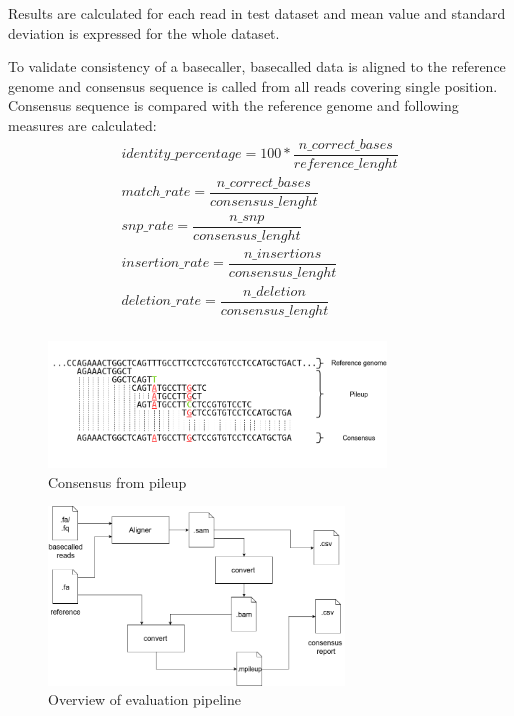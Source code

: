 \documentclass[times, utf8, diplomski, numeric, english]{fer}
\begin{document}
Results are calculated for each read in test dataset and mean value and standard deviation is expressed for the whole dataset.

To validate consistency of a basecaller, basecalled data is aligned to the reference genome and consensus sequence is called from all reads covering single position. Consensus sequence is compared with the reference genome and following measures are calculated:
\begin{gather*}
identity\_percentage =  100 * \dfrac{n\_correct\_bases}{reference\_lenght} \\
match\_rate = \dfrac{n\_correct\_bases}{consensus\_lenght} \\
snp\_rate = \dfrac{n\_snp}{consensus\_lenght}\\
insertion\_rate = \dfrac{n\_insertions}{consensus\_lenght}\\
deletion\_rate = \dfrac{n\_deletion}{consensus\_lenght}\\
\end{gather*}

\begin{figure}[!ht]
	\begin{center}
		\includegraphics[width=0.8\textwidth]{./imgs/consnesus.png}
		\caption{Consensus from pileup}
		\label{fg:consensus}
	\end{center}
\end{figure}


\begin{figure}[!ht]
	\begin{center}
		\includegraphics[width=0.7\textwidth]{./imgs/evaluation_pipeline.png}
		\caption{Overview of evaluation pipeline}
		\label{fg:eval_pipe}
	\end{center}
\end{figure}
\end{document}
